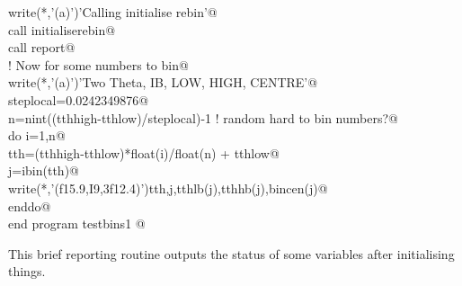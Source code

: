\documentclass[10pt,a4paper,notitlepage]{article}
\begin{document}
\begin{flushleft}
\begin{minipage}{\linewidth}
\begin{list}{}{}
\mbox{}\verb@      write(*,'(a)')'Calling initialise rebin'@\\
\mbox{}\verb@      call initialiserebin@\\
\mbox{}\verb@      call report@\\
\mbox{}\verb@! Now for some numbers to bin@\\
\mbox{}\verb@      write(*,'(a)')'Two Theta, IB, LOW, HIGH, CENTRE'@\\
\mbox{}\verb@      steplocal=0.0242349876@\\
\mbox{}\verb@      n=nint((tthhigh-tthlow)/steplocal)-1   ! random hard to bin numbers?@\\
\mbox{}\verb@      do i=1,n@\\
\mbox{}\verb@        tth=(tthhigh-tthlow)*float(i)/float(n) + tthlow@\\
\mbox{}\verb@        j=ibin(tth)@\\
\mbox{}\verb@        write(*,'(f15.9,I9,3f12.4)')tth,j,tthlb(j),tthhb(j),bincen(j)@\\
\mbox{}\verb@      enddo@\\
\mbox{}\verb@      end program testbins1                                                  @{\NWsep}
\end{list}
\vspace{-1.5ex}
\footnotesize
\begin{list}{}{\setlength{\itemsep}{-\parsep}\setlength{\itemindent}{-\leftmargin}}

\item{}
\end{list}
\end{minipage}\vspace{4ex}
\end{flushleft}
This brief reporting routine outputs the status of some variables after
initialising things.
\end{document}
